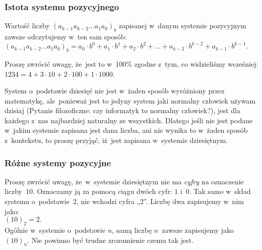 \documentclass[10pt,t]{beamer}
\begin{document}
\begin{frame}
  \frametitle{Istota systemu pozycyjnego}


  Wartość liczby $( a_{ k - 1 } a_{ k - 2 } \ldots a_{ 1 } a_{ 0 } )_{ b }$ zapisanej
  w~danym systemie pozycyjnym zawsze odczytujemy w~ten sam sposób: \\
  $\displaystyle
  ( a_{ k - 1 } a_{ k - 2 } \ldots a_{ 1 } a_{ 0 } )_{ b } =
  a_{ 0 } \cdot b^{ 0 } + a_{ 1 } \cdot b^{ 1 } + a_{ 2 } \cdot b^{ 2 } + \ldots +
  a_{ k - 2 } \cdot b^{ k - 2 } + a_{ k - 1 } \cdot b^{ k - 1 }.$

  Proszę zwrócić uwagę, że~jest to w~100\% zgodne z~tym, co widzieliśmy
  wcześniej: $1234 = 4 + 3 \cdot 10 + 2 \cdot 100 + 1 \cdot 1000$.

  System o~podstawie dziesięć nie jest w~żaden sposób wyróżniony przez
  matematykę, ale~ponieważ jest to jedyny system jaki normalny człowiek
  używam dzisiaj (Pytanie filozoficzne: czy informatyk to normalny
  człowiek?), jest dla każdego z~nas najbardziej naturalny ze
  wszystkich. Dlatego jeśli nie jest podane w~jakim systemie zapisana
  jest dana liczba, ani nie wynika to w~żaden sposób z~kontekstu, to
  proszę przyjąć, iż~jest zapisana w~systemie dziesiętnym.

\end{frame}





\begin{frame}
  \frametitle{Różne systemy pozycyjne}


  Proszę zwrócić uwagę, że~w~systemie dziesiętnym nie ma \textit{cyfry}
  na oznaczenie liczby~$10$. Oznaczamy ją za pomocą ciągu dwóch cyfr: $1$
  i~$0$. Tak samo w~skład systemu o~podstawie~$2$, nie wchodzi cyfra „$2$”.
  Liczbę dwa zapisujemy w~nim jako: \\
  $(10)_{ 2 } = 2.$ \\
  Ogólnie w~systemie o~podstawie $n$, samą liczbę $n$~zawsze zapisujemy jako
  $(10)_{ n }$. Nie powinno być trudne zrozumienie czemu tak jest.


\end{frame}
\end{document}
